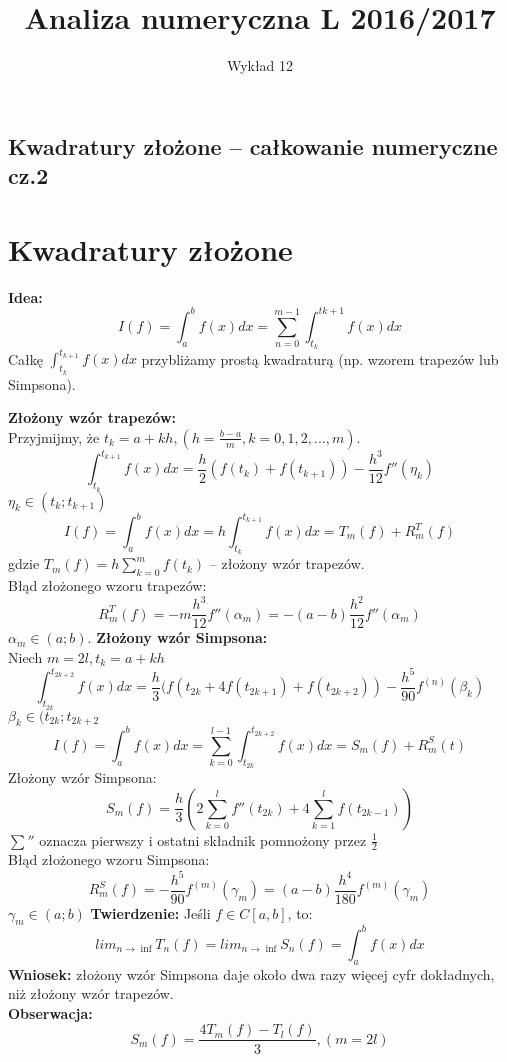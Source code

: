 \documentclass[12pt]{article}
\author{\LARGE Wykład 12}
\title{\bfseries\Huge Analiza numeryczna L 2016/2017}
\date{}
\begin{document}
\maketitle
\begin{center}
\section*{\Large Kwadratury złożone -- całkowanie numeryczne cz.2 }

\end{center}
\vspace{5mm}
\section*{Kwadratury złożone}
\textbf{Idea:}
$$I(f) = \int^b_af(x)dx = \sum^{m-1}_{n=0} \int^{t{k+1}}_{t_k} f(x)dx$$
Całkę $\int^{t_{k+1}}_{t_k} f(x)dx$ przybliżamy prostą kwadraturą (np. wzorem trapezów lub Simpsona).\\
\linebreak


\textbf{Złożony wzór trapezów:}\\
Przyjmijmy, że $t_k=a +kh, (h = \frac{b-a}{m}, k = 0,1,2,...,m)$.
$$\int^{t_{k+1}}_{t_k} f(x)dx = \frac{h}{2}(f(t_k) + f(t_{k+1})) - \frac{h^3}{12}f''(\eta_k)$$
$\eta_k \in (t_k;t_{k+1})$
$$I(f) = \int^b_af(x)dx = h\int^{t_{k+1}}_{t_k} f(x)dx = T_m(f) + R^T_m(f)$$
gdzie $T_m(f) = h \sum^m_{k=0}f(t_k)$ -- złożony wzór trapezów.\\
\linebreak
Błąd złożonego wzoru trapezów:
$$R^T_m(f) = -m\frac{h^3}{12}f''(\alpha_m) = -(a-b)\frac{h^2}{12}f''(\alpha_m)$$
$\alpha_m \in (a;b)$.
\newpage
{}
\setcounter{page}{2}
\textbf{Złożony wzór Simpsona:}\\
Niech $m=2l, t_k=a + kh$
$$\int^{t_{2k+2}}_{t_{2k}} f(x)dx = \frac{h}{3}(f(t_{2k} + 4f(t_{2k+1}) +f(t_{2k+2}))- \frac{h^5}{90}f^{(n)}(\beta_k)$$
$\beta_k \in (t_{2k};t_{2k+2}$
$$I(f) = \int^b_af(x)dx = \sum^{l-1}_{k=0} \int^{t_{2k+2}}_{t_{2k}} f(x)dx = S_m(f) + R^S_m(t)$$
Złożony wzór Simpsona:
$$ S_m(f) =  \frac{h}{3}(2 \sum^l_{k=0}f''(t_{2k}) + 4\sum^l_{k=1} f(t_{2k-1}))$$
$\sum ''$ oznacza pierwszy i ostatni składnik pomnożony przez $\frac{1}{2}$\\
\linebreak
Błąd złożonego wzoru Simpsona:
$$R_m^S(f) = -\frac{h^5}{90}f^{(m)}(\gamma_m) = (a-b)\frac{h^4}{180}f^{(m)}(\gamma_m)$$
$\gamma_m \in (a;b)$
\textbf{Twierdzenie:} Jeśli $f \in C[a,b]$, to:
$$ lim_{n \rightarrow \inf} T_n(f) = lim_{n \rightarrow \inf} S_n(f) = \int^b_a f(x)dx $$
\textbf{Wniosek:} złożony wzór Simpsona daje około dwa razy więcej cyfr dokładnych, niż złożony wzór trapezów.\\
\textbf{Obserwacja:}
$$S_m(f) = \frac{4T_m(f) - T_l(f)}{3}, (m=2l)$$
\newpage
\end{document}

